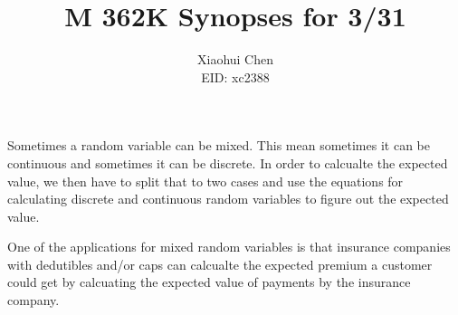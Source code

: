 \documentclass[12pt]{article}
\author{Xiaohui Chen \\EID: xc2388}
\title{M 362K Synopses for 3/31}
\begin{document}
\maketitle
\begin{spacing}{2.0}

Sometimes a random variable can be mixed. This mean sometimes it can be continuous and sometimes it can be discrete. In order to calcualte the expected value, we then have to split that to two cases and use the equations for calculating discrete and continuous random variables to figure out the expected value. 

One of the applications for mixed random variables is that insurance companies with dedutibles and/or caps can calcualte the expected premium a customer could get by calcuating the expected value of payments by the insurance company.

\end{spacing}
\end{document}
